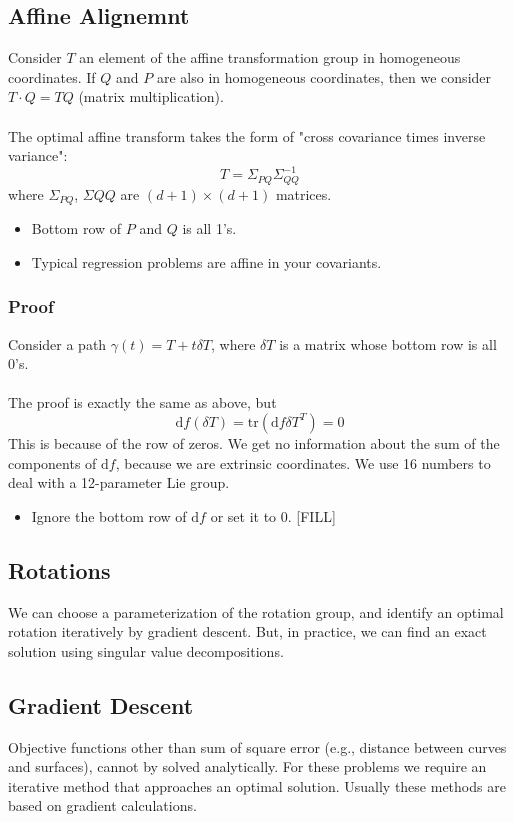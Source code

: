\documentclass[10pt]{article}
\begin{document}
\subsection*{Affine Alignemnt}
Consider $T$ an element of the affine transformation group in homogeneous coordinates.  If $Q$ and $P$ are also in homogeneous coordinates, then we consider $T \cdot Q = TQ$ (matrix multiplication).\\\\
The optimal affine transform takes the form of "cross covariance times inverse variance":
\[T = \Sigma_{PQ} \Sigma_{QQ}^{-1}\]
where $\Sigma_{PQ}$, $\Sigma{QQ}$ are $(d + 1) \times (d + 1)$ matrices.
\begin{itemize}
    \item Bottom row of $P$ and $Q$ is all 1's.
    \item Typical regression problems are affine in your covariants.
\end{itemize}

\subsubsection*{Proof}
Consider a path $\gamma(t) = T + t\delta T$, where $\delta T$ is a matrix whose bottom row is all 0's.\\\\
The proof is exactly the same as above, but
\[\text{d}f (\delta T) = \text{tr} (\text{d}f \delta T^T) = 0\]
This is because of the row of zeros.  We get no information about the sum of the components of $\text{d}f$, because we are extrinsic coordinates.  We use 16 numbers to deal with a 12-parameter Lie group.
\begin{itemize}
    \item Ignore the bottom row of $\text{d}f$ or set it to 0.  [FILL]
\end{itemize}

\subsection*{Rotations}
We can choose a parameterization of the rotation group, and identify an optimal rotation iteratively by gradient descent.  But, in practice, we can find an exact solution using singular value decompositions.

\subsection*{Gradient Descent}
Objective functions other than sum of square error (e.g., distance between curves and surfaces), cannot by solved analytically.  For these problems we require an iterative method that approaches an optimal solution.  Usually these methods are based on gradient calculations.
\end{document}
